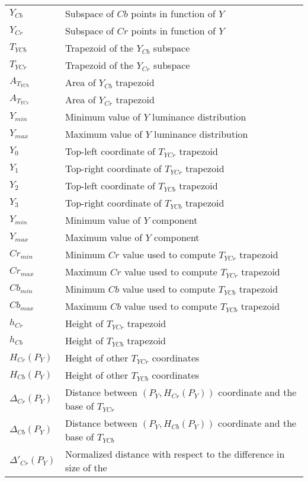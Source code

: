 \documentclass[12pt,twoside,a4paper]{book}
\theoremstyle{plain}
\theoremstyle{definition}
\begin{document}
\clearpage
\begin{tabular}{ll}
    $Y_{Cb}$    & Subspace of $Cb$ points in function of $Y$ \\
    $Y_{Cr}$    & Subspace of $Cr$ points in function of $Y$ \\
    $T_{YCb}$   & Trapezoid of the $Y_{Cb}$ subspace \\
    $T_{YCr}$   & Trapezoid of the $Y_{Cr}$ subspace \\
    $A_{T_{YCb}}$& Area of $Y_{Cb}$ trapezoid \\
    $A_{T_{YCr}}$& Area of $Y_{Cr}$ trapezoid \\
    $Y_{min}$   & Minimum value of $Y$ luminance distribution \\
    $Y_{max}$   & Maximum value of $Y$ luminance distribution \\
    $Y_{0}$     & Top-left coordinate of $T_{YCr}$ trapezoid \\
    $Y_{1}$     & Top-right coordinate of $T_{YCr}$ trapezoid \\
    $Y_{2}$     & Top-left coordinate of $T_{YCb}$ trapezoid \\
    $Y_{3}$     & Top-right coordinate of $T_{YCb}$ trapezoid \\
    $Y_{min}$   & Minimum value of $Y$ component \\
    $Y_{max}$   & Maximum value of $Y$ component \\
    $Cr_{min}$  & Minimum $Cr$ value used to compute $T_{YCr}$ trapezoid \\
    $Cr_{max}$  & Maximum $Cr$ value used to compute $T_{YCr}$ trapezoid \\
    $Cb_{min}$  & Minimum $Cb$ value used to compute $T_{YCb}$ trapezoid \\
    $Cb_{max}$  & Maximum $Cb$ value used to compute $T_{YCb}$ trapezoid \\
    $h_{Cr}$    & Height of $T_{YCr}$ trapezoid \\
    $h_{Cb}$    & Height of $T_{YCb}$ trapezoid \\
    $H_{Cr}(P_Y)$& Height of other $T_{YCr}$ coordinates \\
    $H_{Cb}(P_Y)$& Height of other $T_{YCb}$ coordinates \\
    $\Delta_{Cr}(P_Y)$& Distance between $(P_Y, H_{Cr}(P_Y))$ coordinate and the base of $T_{YCr}$ \\
    $\Delta_{Cb}(P_Y)$& Distance between $(P_Y, H_{Cb}(P_Y))$ coordinate and the base of $T_{YCb}$ \\
    $\Delta'_{Cr}(P_Y)$& Normalized distance with respect to the difference in size of the \\

\end{tabular}
\end{document}
